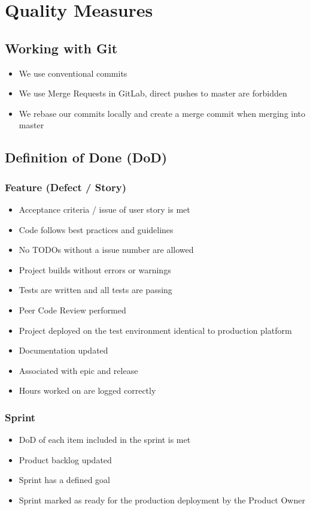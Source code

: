 \chapter{Quality Measures}

\section{Working with Git}
\begin{itemize}
    \item We use conventional commits
    \item We use Merge Requests in GitLab, direct pushes to master are forbidden
    \item We rebase our commits locally and create a merge commit when merging into master
\end{itemize}

\section{Definition of Done (DoD)}

\subsection{Feature (Defect / Story)}
\begin{itemize}
    \item Acceptance criteria / issue of user story is met
    \item Code follows best practices and guidelines
    \item No TODOs without a issue number are allowed
    \item Project builds without errors or warnings
    \item Tests are written and all tests are passing
    \item Peer Code Review performed
    \item Project deployed on the test environment identical to production platform
    \item Documentation updated
    \item Associated with epic and release
    \item Hours worked on are logged correctly
\end{itemize}

\subsection{Sprint}
\begin{itemize}
    \item DoD of each item included in the sprint is met
    \item Product backlog updated
    \item Sprint has a defined goal
    \item Sprint marked as ready for the production deployment by the Product Owner
\end{itemize}

